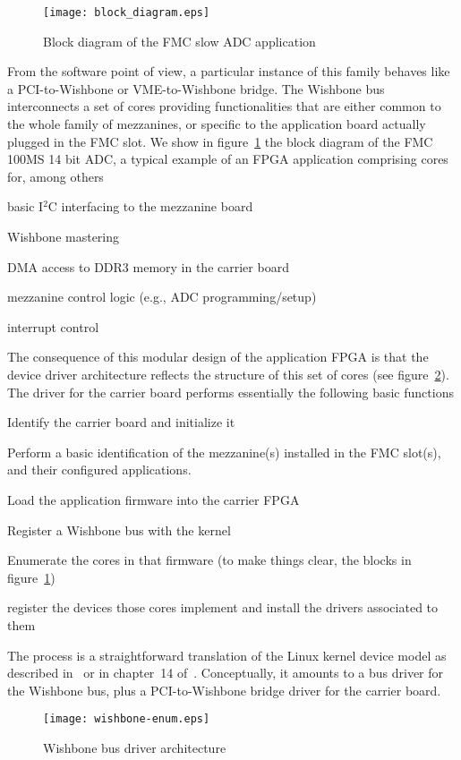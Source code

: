 \documentclass{JAC2003}
\begin{document}
\begin{figure}[tb]
   \centering
   \texttt{[image: block\_diagram.eps]}
   \caption{Block diagram of the FMC slow ADC application}
   \label{slow-adc}
\end{figure}

From the software
point of view, a particular instance of this family behaves like a
PCI-to-Wishbone or VME-to-Wishbone bridge. The Wishbone bus
interconnects a set of cores providing functionalities that are either
common to the whole family of mezzanines, or specific to the application
board actually plugged in the FMC slot. We show in figure~\ref{slow-adc}
the block diagram of the FMC 100MS 14 bit ADC,
a typical example of an FPGA application comprising cores for, among
others
\begin{Itemize}
\item basic I${}^2$C interfacing to the mezzanine board
\item Wishbone mastering
\item DMA access to DDR3 memory in the carrier board
\item mezzanine control logic (e.g., ADC programming/setup)
\item interrupt control
\end{Itemize}
The consequence of this modular design of the application FPGA is that
the device driver architecture reflects the structure of this set of
cores (see figure~\ref{wishbone-enum}). The driver for the carrier board
performs essentially the following basic functions
\begin{Itemize}
\item Identify the carrier board and initialize it
\item Perform a basic identification of the mezzanine(s) installed in
    the FMC slot(s), and their configured applications.
\item Load the application firmware into the carrier FPGA
\item Register a Wishbone bus with the kernel
\item Enumerate the cores in that firmware (to make things clear, the
    blocks in figure~\ref{slow-adc})
\item register the devices those cores implement and install the drivers 
    associated to them
\end{Itemize}
The process is a straightforward translation of the Linux kernel device
model as described in~\cite{device-model} or in chapter~14
of~\cite{rubini}. Conceptually, it amounts to a bus driver for the
Wishbone bus, plus a PCI-to-Wishbone bridge driver for the carrier
board.
\begin{figure}[tb]
   \centering
   \texttt{[image: wishbone-enum.eps]}
   \caption{Wishbone bus driver architecture}
   \label{wishbone-enum}
\end{figure}
\end{document}

